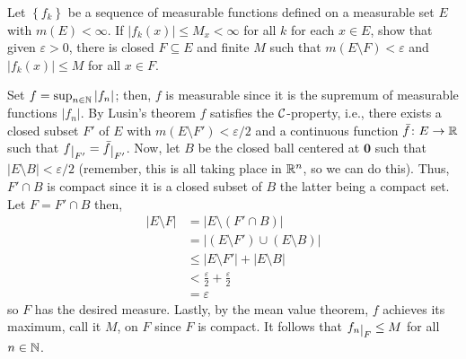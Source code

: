 \begin{problem}
  Let \(\left\{f_k\right\}\) be a sequence of measurable functions defined
  on a measurable set \(E\) with \(m(E)<\infty\). If
  \(|f_k(x)|\leq M_x<\infty\) for all \(k\) for each \(x\in E\), show that
  given \(\varepsilon>0\), there is closed \(F\subseteq E\) and finite
  \(M\) such that \(m(E\setminus F)<\varepsilon\) and \(|f_k(x)|\leq M\)
  for all \(x\in F\).
\end{problem}
\begin{solution}
  Set \(f=\sup_{n\in\mathbb{N}} |f_n|\); then, \(f\) is measurable since it is
  the supremum of measurable functions \(|f_n|\). By Lusin's theorem \(f\)
  satisfies the \(\mathcal{C}\)-property, i.e., there exists a closed subset
  \(F'\) of \(E\) with \(m(E\setminus F')<\varepsilon/2\) and a continuous
  function \(\bar f\colon E\to\mathbb{R}\) such that
  \(f\restrict{F'}=\bar f\restrict{F'}\). Now, let \(B\) be the closed ball
  centered at \(\mathbf{0}\) such that \(|E\setminus B|<\varepsilon/2\)
  (remember, this is all taking place in \(\mathbb{R}^n\), so we can do
  this). Thus, \(F'\cap B\) is compact since it is a closed subset of \(B\)
  the latter being a compact set. Let \(F=F'\cap B\) then,
  \begin{align*}
    |E\setminus F|
    &=|E\setminus(F'\cap B)|\\
    &=|(E\setminus F')\cup(E\setminus B)|\\
    &\leq|E\setminus F'|+|E\setminus B|\\
    &<\frac{\varepsilon}{2}+\frac{\varepsilon}{2}\\
    &=\varepsilon
  \end{align*}
  so \(F\) has the desired measure. Lastly, by the mean value theorem,
  \(f\) achieves its maximum, call it \(M\), on \(F\) since \(F\) is
  compact. It follows that \(f_n\restrict{F}\leq M\) for all \(n\in\mathbb{N}\).
\end{solution}

